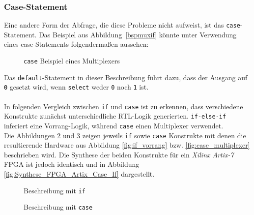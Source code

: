 \subsubsection*{Case-Statement}

Eine andere Form der Abfrage, die diese Probleme nicht aufweist,
ist das \texttt{case}-Statement. Das Beispiel aus Abbildung~\ref{bspmuxif} könnte unter
Verwendung eines case-Statements folgendermaßen aussehen:

\begin{figure}[H]
	\lstset{style=verilog-style}
	
	\caption{\texttt{case} Beispiel eines Multiplexers} \label{bspcase}
\end{figure}

Das \texttt{default}-Statement in dieser Beschreibung führt dazu,
dass der Ausgang auf \texttt{0} gesetzt wird, wenn \texttt{select} weder
\texttt{0} noch \texttt{1} ist.
\\\\
In folgenden Vergleich zwischen \texttt{if} und \texttt{case} ist zu erkennen, dass verschiedene Konstrukte zunächst unterschiedliche RTL-Logik generierten. \texttt{if-else-if} inferiert eine Vorrang-Logik, während \texttt{case} einen Multiplexer verwendet. \\
Die Abbildungen \ref{fig:bspif} und \ref{fig:bspswitch} zeigen jeweils \texttt{if} sowie \texttt{case} Konstrukte mit denen die resultierende Hardware aus Abbildung \ref{fig:if_vorrang} bzw. \ref{fig:case_multiplexer} beschrieben wird. Die Synthese der beiden Konstrukte für ein \emph{Xilinx Artix-7} FPGA ist jedoch identisch und in Abbildung \ref{fig:Synthese_FPGA_Artix_Case_If} dargestellt.

\begin{minipage}[H]{\textwidth}
	\begin{minipage}[b]{0.5\textwidth}
		\centering
		\begin{minipage}[b]{0.9\textwidth}
			\begin{figure}[H]
				\lstset{style=verilog-style}
				
				\caption{Beschreibung mit \texttt{if}} 
				\label{fig:bspif}

			\end{figure}
		\end{minipage}
	\end{minipage}	
	\begin{minipage}[b]{0.5\textwidth}
		\centering
		\begin{minipage}[b]{0.9\textwidth}
			\begin{figure}[H]
				\lstset{style=verilog-style}
				
				\caption{Beschreibung mit \texttt{case}} 
				\label{fig:bspswitch}
			\end{figure}
		\end{minipage}
	\end{minipage}	
\end{minipage}

